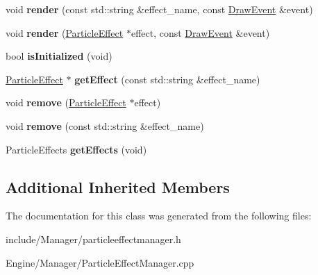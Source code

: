 \begin{DoxyCompactItemize}
\item 
\hypertarget{classEngine_1_1ParticleEffectManager_aa702c07d7043427cd78e9518ff0512d2}{}void {\bfseries render} (const std\+::string \&effect\+\_\+name, const \hyperlink{classEngine_1_1DrawEvent}{Draw\+Event} \&event)\label{classEngine_1_1ParticleEffectManager_aa702c07d7043427cd78e9518ff0512d2}

\item 
\hypertarget{classEngine_1_1ParticleEffectManager_ac52f3d3ce284d80422388d7149171d96}{}void {\bfseries render} (\hyperlink{classEngine_1_1ParticleEffect}{Particle\+Effect} $\ast$effect, const \hyperlink{classEngine_1_1DrawEvent}{Draw\+Event} \&event)\label{classEngine_1_1ParticleEffectManager_ac52f3d3ce284d80422388d7149171d96}

\item 
\hypertarget{classEngine_1_1ParticleEffectManager_a337f876c0f75f7f3dc8e4896f97eba79}{}bool {\bfseries is\+Initialized} (void)\label{classEngine_1_1ParticleEffectManager_a337f876c0f75f7f3dc8e4896f97eba79}

\item 
\hypertarget{classEngine_1_1ParticleEffectManager_a9b05d928b05118f50ab13f69c1a182bf}{}\hyperlink{classEngine_1_1ParticleEffect}{Particle\+Effect} $\ast$ {\bfseries get\+Effect} (const std\+::string \&effect\+\_\+name)\label{classEngine_1_1ParticleEffectManager_a9b05d928b05118f50ab13f69c1a182bf}

\item 
\hypertarget{classEngine_1_1ParticleEffectManager_af652b0b637a88347b521d4b792f857fe}{}void {\bfseries remove} (\hyperlink{classEngine_1_1ParticleEffect}{Particle\+Effect} $\ast$effect)\label{classEngine_1_1ParticleEffectManager_af652b0b637a88347b521d4b792f857fe}

\item 
\hypertarget{classEngine_1_1ParticleEffectManager_a7f8e7adfa89a979a9927c7bcd48ffc85}{}void {\bfseries remove} (const std\+::string \&effect\+\_\+name)\label{classEngine_1_1ParticleEffectManager_a7f8e7adfa89a979a9927c7bcd48ffc85}

\item 
\hypertarget{classEngine_1_1ParticleEffectManager_a019213e48edc21b007129b900c77cd65}{}Particle\+Effects {\bfseries get\+Effects} (void)\label{classEngine_1_1ParticleEffectManager_a019213e48edc21b007129b900c77cd65}

\end{DoxyCompactItemize}
\subsection*{Additional Inherited Members}


The documentation for this class was generated from the following files\+:\begin{DoxyCompactItemize}
\item 
include/\+Manager/particleeffectmanager.\+h\item 
Engine/\+Manager/Particle\+Effect\+Manager.\+cpp\end{DoxyCompactItemize}
